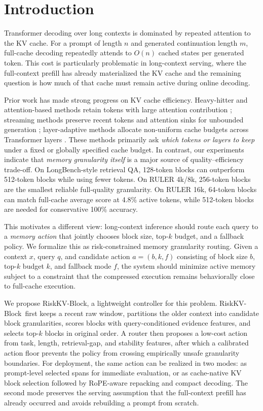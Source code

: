 \documentclass{article}
\newcommand{\method}{RiskKV-Block}
\begin{document}
\section{Introduction}

Transformer decoding over long contexts is dominated by repeated attention to the KV cache.
For a prompt of length $n$ and generated continuation length $m$, full-cache decoding repeatedly attends to $O(n)$ cached states per generated token.
This cost is particularly problematic in long-context serving, where the full-context prefill has already materialized the KV cache and the remaining question is how much of that cache must remain active during online decoding.

Prior work has made strong progress on KV cache efficiency.
Heavy-hitter and attention-based methods retain tokens with large attention contribution \citep{zhang2023h2o,li2024snapkv}; streaming methods preserve recent tokens and attention sinks for unbounded generation \citep{xiao2023streamingllm}; layer-adaptive methods allocate non-uniform cache budgets across Transformer layers \citep{cai2024pyramidkv,yang2024pyramidinfer,zhou2024dynamickv}.
These methods primarily ask \emph{which tokens or layers to keep} under a fixed or globally specified cache budget.
In contrast, our experiments indicate that \emph{memory granularity itself} is a major source of quality--efficiency trade-off.
On LongBench-style retrieval QA, 128-token blocks can outperform 512-token blocks while using fewer tokens.
On RULER 4k/8k, 256-token blocks are the smallest reliable full-quality granularity.
On RULER 16k, 64-token blocks can match full-cache average score at 4.8\% active tokens, while 512-token blocks are needed for conservative 100\% accuracy.

This motivates a different view: long-context inference should route each query to a \emph{memory action} that jointly chooses block size, top-$k$ budget, and a fallback policy.
We formalize this as risk-constrained memory granularity routing.
Given a context $x$, query $q$, and candidate action $a=(b,k,f)$ consisting of block size $b$, top-$k$ budget $k$, and fallback mode $f$, the system should minimize active memory subject to a constraint that the compressed execution remains behaviorally close to full-cache execution.

We propose \method, a lightweight controller for this problem.
\method\ first keeps a recent raw window, partitions the older context into candidate block granularities, scores blocks with query-conditioned evidence features, and selects top-$k$ blocks in original order.
A router then proposes a low-cost action from task, length, retrieval-gap, and stability features, after which a calibrated action floor prevents the policy from crossing empirically unsafe granularity boundaries.
For deployment, the same action can be realized in two modes:
as prompt-level selected spans for immediate evaluation, or as cache-native KV block selection followed by RoPE-aware repacking and compact decoding.
The second mode preserves the serving assumption that the full-context prefill has already occurred and avoids rebuilding a prompt from scratch.
\end{document}
